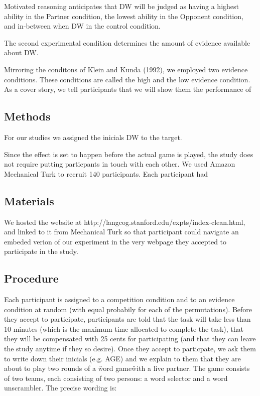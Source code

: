 \documentclass{article} \usepackage{apacite} \usepackage{graphicx} \usepackage{listings}
\begin{document}
Motivated reasoning anticipates that DW will be judged as having a highest ability in the Partner condition, the lowest ability in the Opponent condition, and in-between when DW in the control condition. 

The second experimental condition determines the amount of evidence available about DW.

Mirroring the conditons of Klein and Kunda (1992), we employed two evidence conditions. These conditions are called the high and the low evidence condition. As a cover story, we tell participants that we will show them the performance of



\subsection{Methods}

For our studies we assigned the inicials DW to the target.

Since the effect is set to happen before the actual game is played, the study does not require putting particpants in touch with each other.
We used Amazon Mechanical Turk to recruit 140 participants. Each participant had 

\subsection{Materials}

We hosted the website at http://langcog.stanford.edu/expts/index-clean.html, and linked to it from Mechanical Turk so that participant could navigate an embeded verion of our experiment in the very webpage they accepted to participate in the study.

\subsection{Procedure}

Each participant is assigned to a competition condition and to an evidence condition at random (with equal probabily for each of the permutations). Before they accept to participate, participants are told that the task will take less than 10 minutes (which is the maximum time allocated to complete the task), that they will be compensated with 25 cents for participating (and that they can leave the study anytime if they so desire). Once they accept to particpate, we ask them to write down their inicials (e.g. AGE) and we explain to them that they are about to play two rounds of a \"word game\" with a live partner. The game consists of two teams, each consisting of two persons: a word selector and a word unscrambler. The precise wording is:
\end{document}
